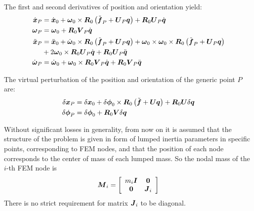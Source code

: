 The first and second derivatives of position and orientation yield:
\begin{align}
	\dot{\T{x}}_P &= \dot{\T{x}}_0
		+ \T{\omega}_0 \times \T{R}_0 \plbr{\tilde{\T{f}}_P + \T{U}_P \T{q}}
		+ \T{R}_0 \T{U}_P \dot{\T{q}} \\
	\T{\omega}_P &= \T{\omega}_0
		+ \T{R}_0 \T{V}_P \dot{\T{q}} \\
	\ddot{\T{x}}_P &= \ddot{\T{x}}_0
		+ \dot{\T{\omega}}_0 \times \T{R}_0 \plbr{\tilde{\T{f}}_P + \T{U}_P \T{q}}
		+ \T{\omega}_0 \times \T{\omega}_0 \times \T{R}_0 \plbr{\tilde{\T{f}}_P + \T{U}_P \T{q}} \nonumber \\
		& \mbox{} + 2 \T{\omega}_0 \times \T{R}_0 \T{U}_P \dot{\T{q}}
		+ \T{R}_0 \T{U}_P \ddot{\T{q}} \\
	\dot{\T{\omega}}_P &= \dot{\T{\omega}}_0
		+ \T{\omega}_0 \times \T{R}_0 \T{V}_P \dot{\T{q}}
		+ \T{R}_0 \T{V}_P \ddot{\T{q}}
\end{align}

The virtual perturbation of the position and orientation
of the generic point $P$ are:
\begin{align}
	\delta{\T{x}}_P &= \delta{\T{x}}_0
		+ \delta\T{\phi}_0 \times \T{R}_0 \plbr{\tilde{\T{f}} + \T{U} \T{q}}
		+ \T{R}_0 \T{U} \delta{\T{q}} \\
	\delta\T{\phi}_P &= \delta\T{\phi}_0
		+ \T{R}_0 \T{V} \delta{\T{q}}
\end{align}

Without significant losses in generality, from now on it is assumed
that the structure of the problem is given in form of lumped inertia
parameters in specific points, corresponding to FEM nodes,
and that the position of each node corresponds to the center of mass
of each lumped mass.
So the nodal mass of the $i$-th FEM node is
\begin{equation}
	\T{M}_i = \sqbr{\matr{cc}{
		m_i \T{I} & \T{0} \\
		\T{0} & \T{J}_i
	}}
\end{equation}
There is no strict requirement for matrix $\T{J}_i$ to be diagonal.

